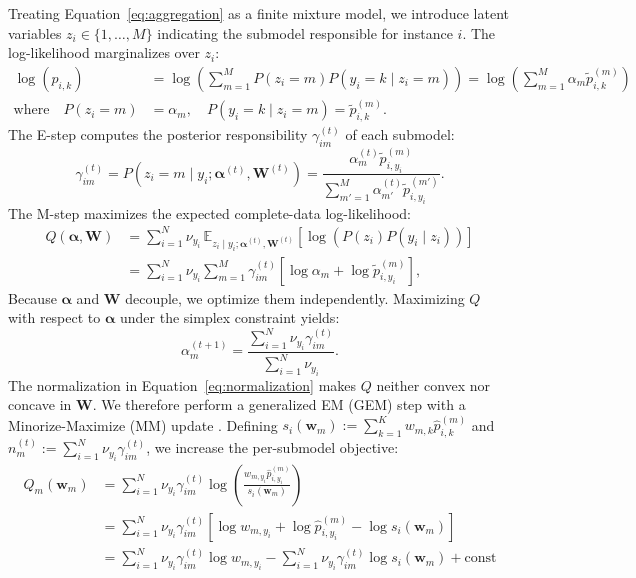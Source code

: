 \documentclass[11pt]{elsarticle}
\begin{document}
Treating Equation~\ref{eq:aggregation} as a finite mixture model, we introduce latent variables $z_i \in \{1, \ldots, M\}$ indicating the submodel responsible for instance $i$. The log-likelihood marginalizes over $z_i$:
\begin{align}
\log(\hat{p}_{i,k}) &= \log\left( \sum_{m=1}^M P(z_i = m) P(y_i = k \mid z_i = m) \right) = \log\left( \sum_{m=1}^M \alpha_m \tilde{p}^{(m)}_{i,k} \right) \\
\text{where} \quad P(z_i = m) &= \alpha_m, \quad P(y_i = k \mid z_i = m) = \tilde{p}^{(m)}_{i,k}.
\end{align}
The E-step computes the posterior responsibility $\gamma_{im}^{(t)}$ of each submodel:
\begin{equation}
    \label{eq:responsibility}
\gamma_{im}^{(t)} = P(z_i = m \mid y_i; \bm{\alpha}^{(t)}, \bm{W}^{(t)}) = \frac{\alpha_m^{(t)} \tilde{p}^{(m)}_{i,y_i}}{\sum_{m'=1}^M \alpha_{m'}^{(t)} \tilde{p}^{(m')}_{i,y_i}}.
\end{equation}
The M-step maximizes the expected complete-data log-likelihood:
\begin{align}
Q(\bm{\alpha}, \bm{W}) &= \sum_{i=1}^N \nu_{y_i} \, \mathbb{E}_{z_i \mid y_i; \bm{\alpha}^{(t)}, \bm{W}^{(t)}} \left[ \log \left( P(z_i) P(y_i \mid z_i) \right) \right] \nonumber \\
&= \sum_{i=1}^N \nu_{y_i} \sum_{m=1}^M \gamma_{im}^{(t)} \left[ \log \alpha_m + \log \tilde{p}^{(m)}_{i,y_i} \right], \label{eq:q_function}
\end{align}
Because $\bm{\alpha}$ and $\bm{W}$ decouple, we optimize them independently. Maximizing $Q$ with respect to $\bm{\alpha}$ under the simplex constraint yields:
\begin{equation}
    \label{eq:alpha_update}
\alpha_m^{(t+1)} = \frac{\sum_{i=1}^N \nu_{y_i} \gamma_{im}^{(t)}}{\sum_{i=1}^N \nu_{y_i}}.
\end{equation}
The normalization in Equation~\eqref{eq:normalization} makes $Q$ neither convex nor concave in $\bm{W}$. We therefore perform a generalized EM (GEM) step with a Minorize-Maximize (MM) update \citep{hunterlange2004mm}. Defining $s_i(\bm{w}_m) := \sum_{k=1}^K w_{m,k} \hat{p}^{(m)}_{i,k}$ and $n_m^{(t)} := \sum_{i=1}^N \nu_{y_i} \gamma_{im}^{(t)}$, we increase the per-submodel objective:
\begin{align}
\label{eq:w_update}
Q_m(\bm{w}_m) &= \sum_{i=1}^N \nu_{y_i} \gamma_{im}^{(t)} \log \left( \frac{w_{m,y_i} \hat{p}^{(m)}_{i,y_i}}{s_i(\bm{w}_m)} \right) \\
 &= \sum_{i=1}^N \nu_{y_i} \gamma_{im}^{(t)} \left[ \log w_{m,y_i} + \log \hat{p}^{(m)}_{i,y_i} - \log s_i(\bm{w}_m) \right] \nonumber \\
&= \sum_{i=1}^N \nu_{y_i} \gamma_{im}^{(t)} \log w_{m,y_i} - \sum_{i=1}^N \nu_{y_i} \gamma_{im}^{(t)} \log s_i(\bm{w}_m) + \text{const} \nonumber \\
\end{align}
\end{document}
